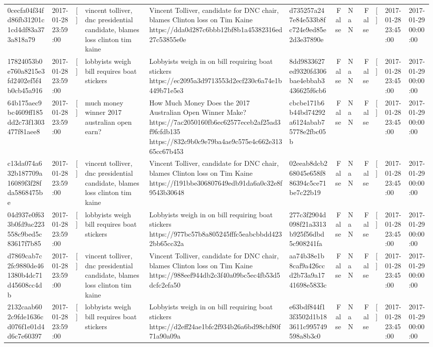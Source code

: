 \begin{tabular}{llllllrlrlll}
0cecfa04f34fd86fb31201c1cd4df83a373a818a79 & 2017-01-28 23:59:00 & [] & vincent tolliver, dnc presidential candidate, blames loss clinton tim kaine & Vincent Tolliver, candidate for DNC chair, blames Clinton loss on Tim Kaine https://dda0d287c6bbb12bf8b1a45382316ed27c53855e0e & d735257a247e84e533b8fc724e9ed85e2d3e37890e & False & NaN & False & [] & 2017-01-28 23:45:00 & 2017-01-29 00:00:00 \\
17824053b0e760a8215e3fd2402ef5f4b0cb45a916 & 2017-01-28 23:59:00 & [] & lobbyists weigh bill requires boat stickers & Lobbyists weigh in on bill requiring boat stickers https://ec2095a3d9713553d2ecf230c6a74e1b449b71e5e3 & 8dd9833627ed9320fd306bae4ebbab3436625f6cb6 & False & NaN & False & [] & 2017-01-28 23:45:00 & 2017-01-29 00:00:00 \\
64b175aec9bc4609ff185dd2c73f1303477f81aee8 & 2017-01-28 23:59:00 & [] & much money winner 2017 australian open earn? & How Much Money Does the 2017 Australian Open Winner Make? https://7ac2050160fb6ec62577eceb2af25ad3f9fcfdb135 https://832c9b0c9e79ba4ae9c575e4c662e31365cc67b453 & cbcbe171b6b44bd74292a6124abab75778e2fbc05b & False & NaN & False & [] & 2017-01-28 23:45:00 & 2017-01-29 00:00:00 \\
c13da074a632b187709a16089f3f28fda5868475be & 2017-01-28 23:59:00 & [] & vincent tolliver, dnc presidential candidate, blames loss clinton tim kaine & Vincent Tolliver, candidate for DNC chair, blames Clinton loss on Tim Kaine https://f191bbe306807649edb91da6a0c32e8f9543b30648 & 02eeab8dcb268045e658f886394c5ce71be7c22b19 & False & NaN & False & [] & 2017-01-28 23:45:00 & 2017-01-29 00:00:00 \\
04d937e0f633b0fd9ac223558c9bed5c83617f7b85 & 2017-01-28 23:59:00 & [] & lobbyists weigh bill requires boat stickers & Lobbyists weigh in on bill requiring boat stickers https://977bc57b8a805245fffc5eabcbbdd4232bb65cc32a & 277c3f2904d098f21a3313b925f56dbd5c908241fa & False & NaN & False & [] & 2017-01-28 23:45:00 & 2017-01-29 00:00:00 \\
d7869cab7c2fc9880de461380b4dc71d45608cc4db & 2017-01-28 23:59:00 & [] & vincent tolliver, dnc presidential candidate, blames loss clinton tim kaine & Vincent Tolliver, candidate for DNC chair, blames Clinton loss on Tim Kaine https://988eef944db2c3f40a09bc5ec4fb53d5dcfc2efa50 & aa74b38e1b8caf9a426ccd2b73a9a1741698e5833c & False & NaN & False & [] & 2017-01-28 23:45:00 & 2017-01-29 00:00:00 \\
2132caab602c9fde1636cd076f1e01d4d6c7e60397 & 2017-01-28 23:59:00 & [] & lobbyists weigh bill requires boat stickers & Lobbyists weigh in on bill requiring boat stickers https://d2eff24ae1bfc2f934b26a6bd98cbf80f71a90a09a & e63bdf844f13f3502d1b183611c995749598a8b3c0 & False & NaN & False & [] & 2017-01-28 23:45:00 & 2017-01-29 00:00:00 \\

\end{tabular}
